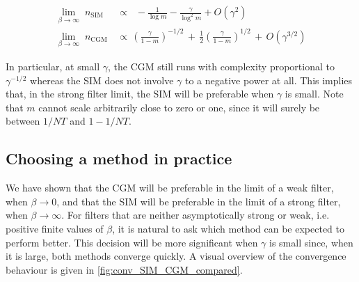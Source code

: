 \begin{align}
    \lim_{\beta \rightarrow \infty} \;  n_{\text{SIM}} \, & \propto \;\;  -\frac{1}{\log m} - \frac{\gamma}{\log^2 m} + O\left(\gamma^2\right) \\[0.5cm]
    \lim_{\beta \rightarrow \infty} \;  n_{\text{CGM}} \, & \propto \, \left(\frac{\gamma}{1 - m} \right)^{-1/2} \, + \, \frac{1}{2}\left(\frac{\gamma}{1 - m}\right)^{1/2} \, + \, O\left(\gamma^{3/2}\right) 
\end{align}

In particular, at small $\gamma$, the CGM still runs with complexity proportional to $\gamma^{-1/2}$ whereas the SIM does not involve $\gamma$ to a negative power at all. This implies that, in the strong filter limit, the SIM will be preferable when $\gamma$ is small. Note that $m$ cannot scale arbitrarily close to zero or one, since it will surely be between $1/NT$ and $1 - 1/NT$. 



\subsection{Choosing a method in practice}

We have shown that the CGM will be preferable in the limit of a weak filter, when $\beta \rightarrow 0$, and that the SIM will be preferable in the limit of a strong filter, when $\beta \rightarrow \infty$. For filters that are neither asymptotically strong or weak, i.e. positive finite values of $\beta$, it is natural to ask which method can be expected to perform better. This decision will be more significant when $\gamma$ is small since, when it is large, both methods converge quickly. A visual overview of the convergence behaviour is given in \cref{fig:conv_SIM_CGM_compared}. 

\vspace{0.5cm}

